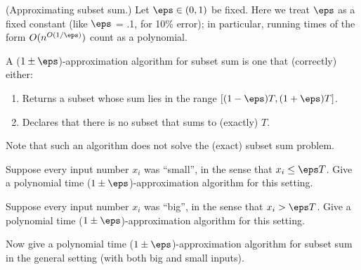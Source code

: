 \documentclass{article}
\begin{document}
\setcounter{section}{11}
\setcounter{exercise}{8}

 (Approximating subset sum.) Let $ \eps\in (0, 1)$ be fixed.
Here we treat $ \eps $ as a fixed constant (like $ \eps $ = .1, for 10\% error); in particular, running times of the form $ O(n^{O(1/\eps)}) $ count as a polynomial.

A ($ 1 \pm \eps $)-approximation algorithm for subset sum is one that (correctly) either: \begin{enumerate}
  \item Returns a subset whose sum lies in the range $[( 1-\eps )T , ( 1+\eps )T ]$.
  \item Declares that there is no subset that sums to (exactly) $T$.
\end{enumerate}
Note that such an algorithm does not solve the (exact) subset sum problem.


\begin{subexercise}
  Suppose every input number $ x_i $ was ``small'', in the sense that $ x_i \leq \eps T $. Give a polynomial time ($ 1\pm \eps $)-approximation algorithm for this setting.
\end{subexercise}

\begin{solution}

\end{solution}
\pagebreak

\begin{subexercise}
  Suppose every input number $ x_i $ was ``big'', in the sense that $ x_i > \eps T $. Give a polynomial time ($ 1\pm \eps $)-approximation algorithm for this setting.
\end{subexercise}

\begin{solution}

\end{solution}
\pagebreak

\begin{subexercise}
  Now give a polynomial time ($ 1\pm \eps $)-approximation algorithm for subset sum in the general setting (with both big and small inputs).
\end{subexercise}

\begin{solution}

\end{solution}
\end{document}
